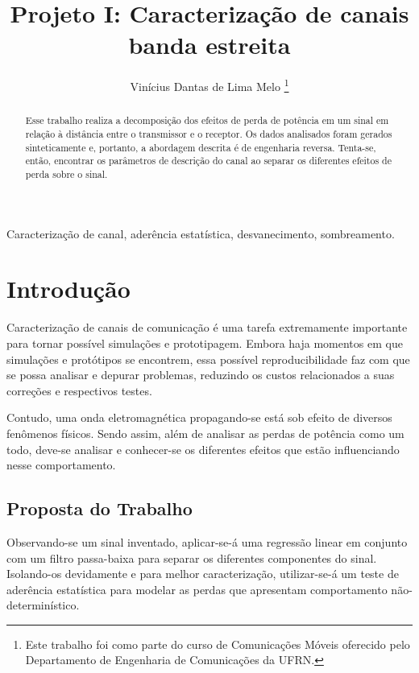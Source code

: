\documentclass[journal,11pt,twocolumn]{IEEEtran}
\begin{document}
\title{Projeto I: Caracteriza\c{c}\~{a}o de canais banda estreita}


\author{Vinícius Dantas de Lima Melo
    \thanks{Este trabalho foi como parte do curso de Comunicações Móveis oferecido pelo Departamento de Engenharia de Comunicações da UFRN.}
}


\maketitle

\begin{abstract}
Esse trabalho realiza a decomposição dos efeitos de perda de potência em um sinal em relação à distância entre o transmissor e o receptor. Os dados analisados foram gerados sinteticamente e, portanto, a abordagem descrita é de engenharia reversa. Tenta-se, então, encontrar os parâmetros de descrição do canal ao separar os diferentes efeitos de perda sobre o sinal.
\end{abstract}

\begin{keywords}
Caracterização de canal, aderência estatística, desvanecimento, sombreamento.
\end{keywords}


\section{Introdução}
Caracterização de canais de comunicação é uma tarefa extremamente importante para tornar possível simulações e prototipagem. Embora haja momentos em que simulações e protótipos se encontrem, essa possível reproducibilidade faz com que se possa analisar e depurar problemas, reduzindo os custos relacionados a suas correções e respectivos testes. 

Contudo, uma onda eletromagnética propagando-se está sob efeito de diversos fenômenos físicos. Sendo assim, além de analisar as perdas de potência como um todo, deve-se analisar e conhecer-se os diferentes efeitos que estão influenciando nesse comportamento.

\subsection{Proposta do Trabalho}
Observando-se um sinal inventado, aplicar-se-á uma regressão linear em conjunto com um filtro passa-baixa para separar os diferentes componentes do sinal. Isolando-os devidamente e para melhor caracterização, utilizar-se-á um teste de aderência estatística para modelar as perdas que apresentam comportamento não-determinístico.
\end{document}
